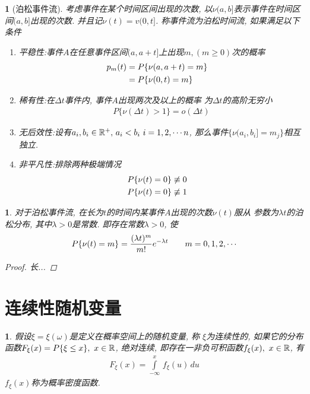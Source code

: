 \newtheorem*{poisson_event_flow}{}
\begin{poisson_event_flow}[泊松事件流]
考虑事件在某个时间区间出现的次数, 以\(\nu(a, b]\)表示事件在时间区间\((a , b]\)出现的次数.
并且记\(\nu(t) = v(0, t]\).
称事件流为泊松时间流, 如果满足以下条件
\begin{enumerate}
\item 平稳性:\quad 事件\(A\)在任意事件区间\((a,a+t]\)上出现\(m, (m\ge 0)\)次的概率
\begin{align}
    p_m(t) &= P\{\nu(a, a+t) = m\}\cr
    &= P\{\nu(0, t) = m\}
\end{align}
\item 稀有性:\quad 在\(\Delta t\)事件内, 事件\(A\)出现两次及以上的概率
为\(\Delta t\)的高阶无穷小
\begin{align}
P\{\nu(\Delta t) > 1\} = o(\Delta t)
\end{align}
\item 无后效性:\quad 设有\(a_i, b_i\in\Rs^+,\, a_i < b_i\,\, i = 1, 2, \cdots n\), 那么事件\(\{\nu(a_i, b_i] = m_j\}\)相互独立.
\item 非平凡性:\quad 排除两种极端情况
\begin{align}
    &P\{\nu(t) = 0\} \not\equiv 0\cr
    &P\{\nu(t) = 0\} \not\equiv 1
\end{align}
\end{enumerate}
\end{poisson_event_flow}

\newtheorem{about_poisson_event}[theorem_root]{\theorem}
\begin{about_poisson_event}
对于泊松事件流, 在长为\(t\)的时间内某事件\(A\)出现的次数\(\nu(t)\)服从
参数为\(\lambda t\)的泊松分布, 其中\(\lambda > 0\)是常数.
即存在常数\(\lambda > 0\), 使
\begin{align}
    P\{\nu(t) = m\} = {(\lambda t)^m\over m!}e^{-\lambda t}\qquad m = 0, 1, 2, \cdots
\end{align}

\begin{proof}
    长...
\end{proof}
\end{about_poisson_event}

\section{连续性随机变量}%

\newtheorem{cont_distr_var}[theorem_root]{}
\begin{cont_distr_var}
假设\(\xi = \xi(\omega)\)是定义在概率空间\prbsp 上的随机变量, 称
\(\xi\)为连续性的, 如果它的分布函数\(F_\xi(x) = P\{\xi\le x\},\,\, x\in\Rs\), 
绝对连续, 即存在一非负可积函数\(f_\xi(x),\,\,x\in\Rs\), 有
\begin{align}
F_\xi(x) = \int\limits_{-\infty}^{x}\,f_\xi(u)\,du
\end{align}
\(f_\xi(x)\)称为概率密度函数.
\end{cont_distr_var}

